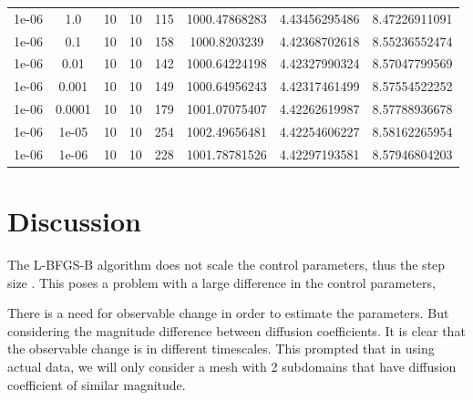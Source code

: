 \documentclass[11pt,a4paper]{article}
\begin{document}
\begin{table}
{\begin{tabular}{*{8}c}
 1e-06 & 1.0 &10 &10 & 115& 1000.47868283 & 4.43456295486 & 8.47226911091 \\
 1e-06 & 0.1 &10 &10 & 158& 1000.8203239 & 4.42368702618 & 8.55236552474 \\
 1e-06 & 0.01 &10 &10 & 142& 1000.64224198 & 4.42327990324 & 8.57047799569 \\
 1e-06 & 0.001 &10 &10 & 149& 1000.64956243 & 4.42317461499 & 8.57554522252 \\
 1e-06 & 0.0001 &10 &10 & 179& 1001.07075407 & 4.42262619987 & 8.57788936678 \\
 1e-06 & 1e-05 &10 &10 & 254& 1002.49656481 & 4.42254606227 & 8.58162265954 \\
 1e-06 & 1e-06 &10 &10 & 228& 1001.78781526 & 4.42297193581 & 8.57946804203 \\
\end{tabular}}
\label{Tab::1}
\end{table} 


\section{Discussion}




The L-BFGS-B algorithm does not scale the control parameters, thus the step size . This poses a problem with a large difference in the control parameters, 







There is a need for observable change in order to estimate the parameters. But considering the magnitude difference between diffusion coefficients. It is clear that the observable change is in different timescales. This prompted that in using actual data, we will only consider a mesh with 2 subdomains that have diffusion coefficient of similar magnitude.   


  






\end{document}
